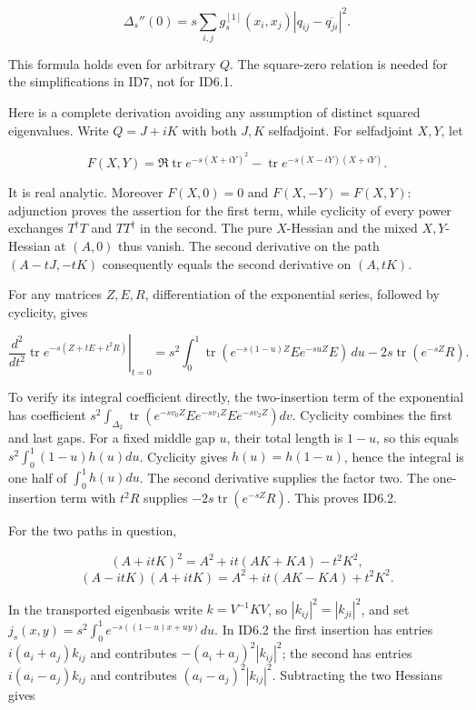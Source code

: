 \documentclass[11pt]{article}
\begin{document}
\[
\boxed{\Delta_s''(0)
=s\sum_{i,j}g_s^{[1]}(x_i,x_j)
|q_{ij}-\overline{q_{ji}}|^2.} \tag{ID6.1}
\]

This formula holds even for arbitrary \(Q\). The square-zero relation is needed for the simplifications in ID7, not for ID6.1.

Here is a complete derivation avoiding any assumption of distinct squared eigenvalues. Write \(Q=J+iK\) with both \(J,K\) selfadjoint. For selfadjoint \(X,Y\), let

\[
F(X,Y)=\Re\operatorname{tr}e^{-s(X+iY)^2}
-\operatorname{tr}e^{-s(X-iY)(X+iY)}.
\]

It is real analytic. Moreover \(F(X,0)=0\) and \(F(X,-Y)=F(X,Y)\): adjunction proves the assertion for the first term, while cyclicity of every power exchanges \(T^\dagger T\) and \(TT^\dagger\) in the second. The pure \(X\)-Hessian and the mixed \(X,Y\)-Hessian at \((A,0)\) thus vanish. The second derivative on the path \((A-tJ,-tK)\) consequently equals the second derivative on \((A,tK)\).

For any matrices \(Z,E,R\), differentiation of the exponential series, followed by cyclicity, gives

\[
\left.\frac{d^2}{dt^2}\operatorname{tr}e^{-s(Z+tE+t^2R)}\right|_{t=0}
=s^2\int_0^1\operatorname{tr}(e^{-s(1-u)Z}E e^{-suZ}E)\,du
-2s\operatorname{tr}(e^{-sZ}R). \tag{ID6.2}
\]

To verify its integral coefficient directly, the two-insertion term of the exponential has coefficient \(s^2\int_{\Delta_2}\operatorname{tr}
(e^{-sv_0Z}E e^{-sv_1Z}E e^{-sv_2Z})dv\). Cyclicity combines the first and last gaps. For a fixed middle gap \(u\), their total length is \(1-u\), so this equals \(s^2\int_0^1(1-u)h(u)du\). Cyclicity gives \(h(u)=h(1-u)\), hence the integral is one half of \(\int_0^1h(u)du\). The second derivative supplies the factor two. The one-insertion term with \(t^2R\) supplies \(-2s\operatorname{tr}(e^{-sZ}R)\). This proves ID6.2.

For the two paths in question,

\[
(A+itK)^2=A^2+it(AK+KA)-t^2K^2,
\] \[
(A-itK)(A+itK)=A^2+it(AK-KA)+t^2K^2.
\]

In the transported eigenbasis write \(k=V^{-1}KV\), so \(|k_{ij}|^2=|k_{ji}|^2\), and set \(j_s(x,y)=s^2\int_0^1e^{-s((1-u)x+uy)}du\). In ID6.2 the first insertion has entries \(i(a_i+a_j)k_{ij}\) and contributes \(-(a_i+a_j)^2|k_{ij}|^2\); the second has entries \(i(a_i-a_j)k_{ij}\) and contributes \((a_i-a_j)^2|k_{ij}|^2\). Subtracting the two Hessians gives
\end{document}
